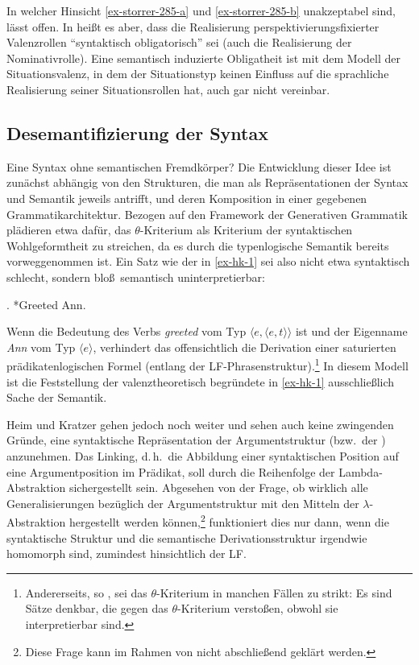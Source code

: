 {In welcher Hinsicht \ref{ex-storrer-285-a} und \ref{ex-storrer-285-b} unakzeptabel sind, lässt \cite{Storrer:92}  offen. In \citet[240]{Storrer:96} hei\ss t es aber, dass die Realisierung perspektivierungsfixierter Valenzrollen "`syntaktisch obligatorisch"' sei (auch die Realisierung der Nominativrolle). Eine semantisch induzierte Obligatheit ist mit dem Modell der Situationsvalenz, in dem der Situationstyp keinen Einfluss auf die sprachliche Realisierung seiner Situationsrollen hat, auch gar nicht vereinbar.    


\subsection{Desemantifizierung der Syntax}

Eine Syntax ohne semantischen Fremdkörper? Die Entwicklung dieser Idee ist zunächst abhängig von den Strukturen, die man als Repräsentationen der Syntax und Semantik jeweils antrifft, und deren Komposition in einer gegebenen Grammatikarchitektur. Bezogen auf den Framework der Generativen Grammatik plädieren etwa \citet[Kapitel~3]{Heim:Kratzer:98} dafür, das $\theta$-Kriterium als Kriterium der syntaktischen Wohlgeformtheit zu streichen, da es durch die typenlogische Semantik bereits vorweggenommen ist. Ein Satz wie der in \ref{ex-hk-1} sei also nicht etwa syntaktisch schlecht, sondern blo\ss\  semantisch uninterpretierbar:

\ex. \label{ex-hk-1} *Greeted Ann.  \hfill \citep[50]{Heim:Kratzer:98}

Wenn die Bedeutung des Verbs {\it greeted} vom Typ $\langle e,\langle e,t \rangle \rangle$ ist und der Eigenname {\it Ann} vom Typ $\langle e \rangle$, verhindert das offensichtlich die Derivation einer saturierten prädikatenlogischen Formel (entlang der  LF-Phrasenstruktur).\footnote{Andererseits, so \citet[51f]{Heim:Kratzer:98}, sei das $\theta$-Kriterium in manchen Fällen zu strikt: Es sind Sätze denkbar, die gegen das $\theta$-Kriterium versto\ss en, obwohl sie interpretierbar sind.} In diesem Modell ist die Feststellung der valenztheoretisch begründete  in \ref{ex-hk-1} ausschlie\ss lich Sache der Semantik.

Heim und Kratzer gehen jedoch noch weiter und sehen auch keine zwingenden Gründe, eine syntaktische Repräsentation der Argumentstruktur (bzw.\ der ) anzunehmen. Das Linking, d.\,h.\ die Abbildung einer syntaktischen Position auf eine Argumentposition im Prädikat, soll durch die Reihenfolge der Lambda-Abstraktion sichergestellt sein. Abgesehen von der Frage, ob wirklich alle Generalisierungen bezüglich der Argumentstruktur mit den Mitteln der $\lambda$-Abstraktion hergestellt werden können,\footnote{Diese Frage kann im Rahmen von \cite{Heim:Kratzer:98} nicht abschlie\ss end geklärt werden.} funktioniert dies nur dann, wenn die syntaktische Struktur und die semantische Derivationsstruktur irgendwie homomorph sind, zumindest hinsichtlich der LF.  

}
